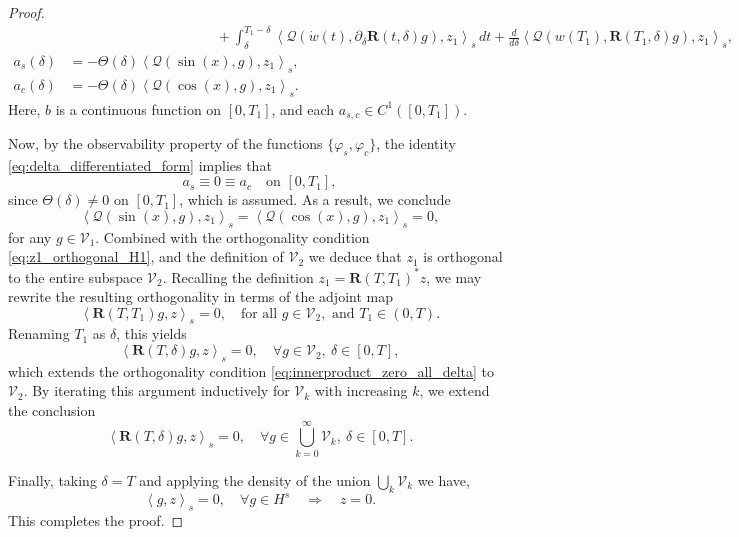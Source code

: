 \documentclass[10pt, reqno]{amsart}
\numberwithin{equation}{section}
\begin{document}
\begin{proof}
\begin{align*}
	&\quad \hspace{4cm} + \int_{\delta}^{T_1 - \delta} \left\langle \mathcal{Q}(\dot{w}(t), \partial_\delta \mathbf{R}(t, \delta)g), z_1 \right\rangle_s \, dt + \frac{d}{d\delta} \left\langle \mathcal{Q}(w(T_1), \mathbf{R}(T_1, \delta)g), z_1 \right\rangle_s, \\
	a_s(\delta) &= -\varTheta(\delta) \left\langle \mathcal{Q}(\sin(x), g), z_1 \right\rangle_s, \\
	a_c(\delta) &= - \varTheta(\delta) \left\langle \mathcal{Q}(\cos(x), g), z_1 \right\rangle_s.
\end{align*}
Here, \( b \) is a continuous function on \( [0, T_1] \), and each \( a_{s,c} \in C^1([0, T_1]) \).

Now, by the observability property of the functions \( \{ \varphi_s, \varphi_c \} \), the identity \eqref{eq:delta_differentiated_form} implies that
\[
a_s \equiv 0 \equiv a_c \quad \text{on } [0, T_1], 
\]
since \( \varTheta(\delta) \neq 0 \) on \( [0, T_1] \), which is assumed. As a result, we conclude
\[
\left\langle \mathcal{Q}(\sin(x), g), z_1 \right\rangle_s = \left\langle \mathcal{Q}(\cos(x), g), z_1 \right\rangle_s = 0,
\]
for any \( g \in \mathcal{V}_1 \).
Combined with the orthogonality condition \eqref{eq:z1_orthogonal_H1}, and the definition of $\mathcal{V}_2$ we deduce that \( z_1 \) is orthogonal to the entire subspace $\mathcal{V}_2.$
Recalling the definition \( z_1 = \mathbf{R}(T, T_1)^* z \), we may rewrite the resulting orthogonality in terms of the adjoint map
\[
\left\langle \mathbf{R}(T, T_1)g, z \right\rangle_s = 0, \quad \text{for all } g \in \mathcal{V}_2, \text{ and } T_1 \in (0, T).
\]
Renaming \( T_1 \) as \( \delta \), this yields
\[
\left\langle \mathbf{R}(T, \delta)g, z \right\rangle_s = 0, \quad \forall g \in \mathcal{V}_2,\ \delta \in [0, T],
\]
which extends the orthogonality condition \eqref{eq:innerproduct_zero_all_delta} to \( \mathcal{V}_2 \).
By iterating this argument inductively for \( \mathcal{V}_k \) with increasing \( k \), we extend the conclusion
\[
\left\langle \mathbf{R}(T, \delta)g, z \right\rangle_s = 0, \quad \forall g \in \bigcup_{k=0}^\infty \mathcal{V}_k,\ \delta \in [0, T].
\]

Finally, taking \( \delta = T \) and applying the density of the union \( \bigcup_k \mathcal{V}_k \) we have,
\[
\left\langle g, z \right\rangle_s = 0, \quad \forall g \in H^s \quad \Rightarrow \quad z = 0.
\]
This completes the proof. 
\end{proof}
\end{document}
